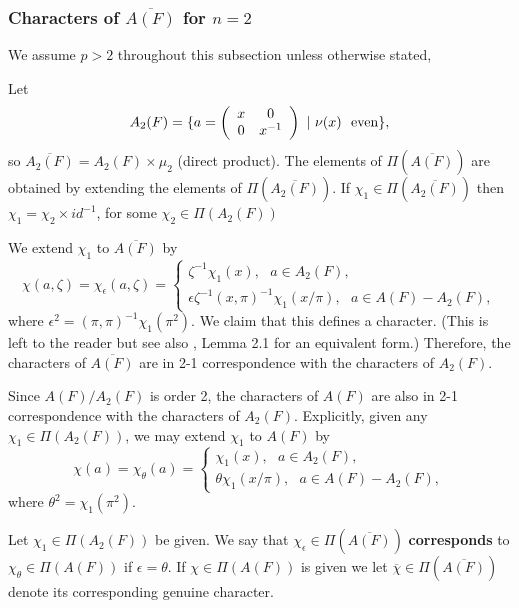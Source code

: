\subsubsection{Characters of $\overline{A(F)}$ for $n=2$}

We assume $p>2$ throughout this subsection unless otherwise
stated,

Let
\[
A_2(F)=\{
a=\left(
\begin{array}{cc}
x & 0\\
0 & x^{-1}
\end{array}
\right)
\ |\ \nu (x)\ {\rm \ even}\},
\]
so $\overline{A_2(F)}
=A_2(F)\times \mu_2$ (direct product).
The elements of $\Pi(\overline{A(F)})$ are obtained by extending
the elements of $\Pi(\overline{A_2(F)})$.
If $\chi_1\in \Pi(\overline{A_2(F)})$ then
$\chi_1=\chi_2\times id^{-1}$,
for some $\chi_2\in \Pi(A_2(F))$

We extend $\chi_1$ to $\overline{A(F)}$ by
\begin{equation}
\chi(a,\zeta)=\chi_\epsilon (a,\zeta)=
\left\{
\begin{array}{c}
\zeta^{-1}\chi_1(x),\ \ \ a\in A_2(F),\\
\epsilon\zeta^{-1}(x,\pi)^{-1}\chi_1(x/\pi),
\ \ \ a\in A(F)-A_2(F),
\end{array}
\right.
\end{equation}
where $\epsilon^2 = (\pi,\pi)^{-1}\chi_1(\pi^2)$. We claim
that this defines a character. (This is left to
the reader but see also \cite{GS}, Lemma 2.1 for an equivalent form.)
Therefore, the characters of $\overline{A(F)}$ are in 2-1 correspondence
with the characters of $A_2(F)$.

Since $A(F)/A_2(F)$ is order 2, the characters of $A(F)$ are
also in 2-1 correspondence with the characters of $A_2(F)$.
Explicitly, given any $\chi_1\in \Pi(A_2(F))$, we
may extend $\chi_1$ to $A(F)$ by
\begin{equation}
\chi(a)=\chi_\theta (a)=
\left\{
\begin{array}{c}
\chi_1(x),\ \ \ a\in A_2(F),\\
\theta \chi_1(x/\pi), \ \ \ a\in A(F)-A_2(F),
\end{array}
\right.
\end{equation}
where $\theta^2 = \chi_1(\pi^2)$.

\begin{definition} Let $\chi_1\in \Pi(A_2(F))$ be given.
We say that
$\chi_\epsilon\in \Pi(\overline{A(F)})$ {\bf corresponds}
to $\chi_\theta \in \Pi(A(F))$ if $\epsilon =\theta$.
If $\chi \in \Pi(A(F))$ is given we let
$\overline{\chi}\in \Pi(\overline{A(F)})$ denote
its corresponding genuine character.
\end{definition}

